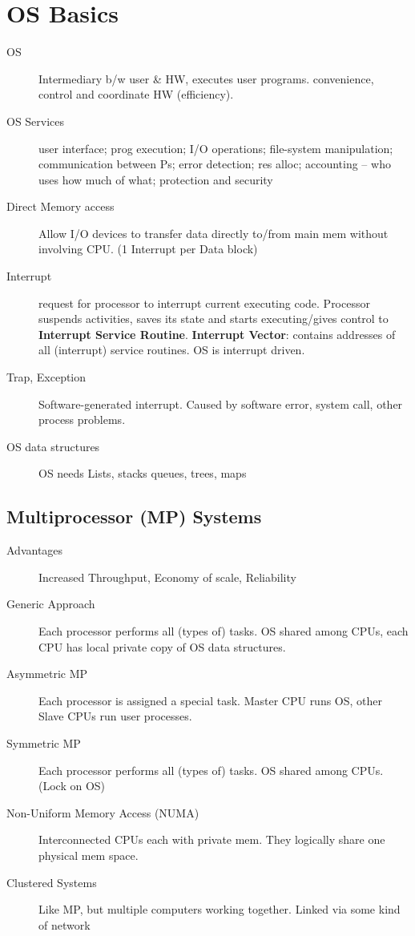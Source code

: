 \section*{OS Basics}
\begin{description}
  \item[OS] Intermediary b/w user \& HW, executes user programs. convenience, control and coordinate HW  (efficiency).
  \item[OS Services] user interface; prog execution; I/O operations; file-system manipulation; communication between Ps; error detection; res alloc; accounting – who uses how much of what; protection and security
  \item[Direct Memory access] Allow I/O devices to transfer data directly to/from main mem without involving CPU. (1 Interrupt per Data block) %
  \item[Interrupt] request for processor to interrupt current executing code. Processor suspends activities, saves its state and starts executing/gives control to \textbf{Interrupt Service Routine}. \textbf{Interrupt Vector}: contains addresses of all (interrupt) service routines. OS is interrupt driven.
  \item[Trap, Exception] Software-generated interrupt. Caused by software error, system call, other process problems.
  \item[OS data structures] OS needs Lists, stacks queues, trees, maps
\end{description}

\subsection*{Multiprocessor (MP) Systems}
\begin{description}
\item[Advantages]Increased Throughput, Economy of scale, Reliability
  \item[Generic Approach] Each processor performs all (types of) tasks. OS shared among CPUs, each CPU has local private copy of OS data structures.
  \item[Asymmetric MP] Each processor is assigned a special task. Master CPU runs OS, other Slave CPUs run user processes.
  \item[Symmetric MP] Each processor performs all (types of) tasks. OS shared among CPUs. (Lock on OS)
  \item[Non-Uniform Memory Access (NUMA)] Interconnected CPUs each with private mem. They logically share one physical mem space.
  \item[Clustered Systems] Like MP, but multiple computers working together. Linked via some kind of network %
\end{description}

